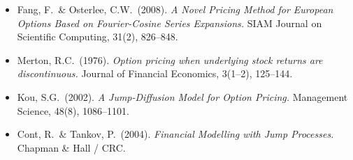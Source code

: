 \documentclass[12pt, a4paper]{article}
\theoremstyle{definition}
\begin{document}
\begin{itemize}[leftmargin=2em]
  \item Fang, F.\ \& Osterlee, C.W.\ (2008).
        \textit{A Novel Pricing Method for European Options Based on
        Fourier-Cosine Series Expansions.}
        SIAM Journal on Scientific Computing, 31(2), 826--848.

  \item Merton, R.C.\ (1976).
        \textit{Option pricing when underlying stock returns are discontinuous.}
        Journal of Financial Economics, 3(1--2), 125--144.

  \item Kou, S.G.\ (2002).
        \textit{A Jump-Diffusion Model for Option Pricing.}
        Management Science, 48(8), 1086--1101.

  \item Cont, R.\ \& Tankov, P.\ (2004).
        \textit{Financial Modelling with Jump Processes.}
        Chapman \& Hall / CRC.
\end{itemize}
\end{document}
